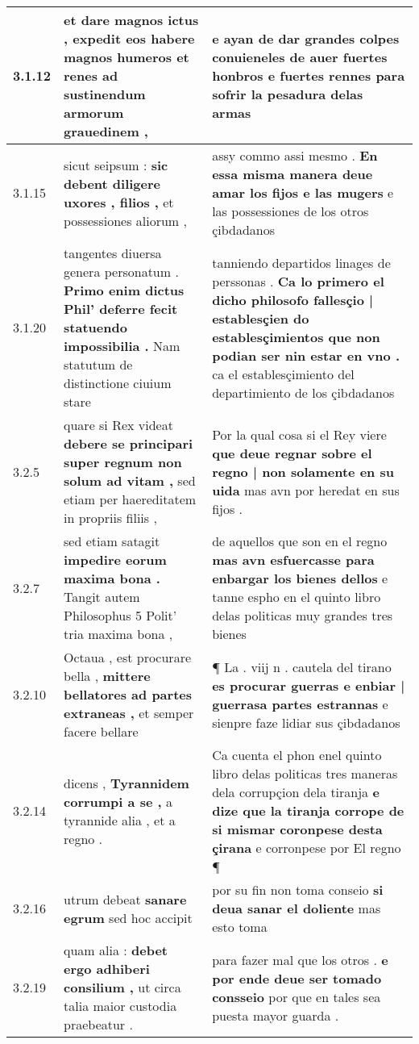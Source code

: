 \begin{tabular}{|p{1cm}|p{6.5cm}|p{6.5cm}|}
3.1.12 & et dare magnos ictus , \textbf{ expedit eos habere magnos humeros et renes } ad sustinendum armorum grauedinem , & e ayan de dar grandes colpes \textbf{ conuieneles de auer fuertes honbros e fuertes rennes } para sofrir la pesadura delas armas \\\hline
3.1.15 & sicut seipsum : \textbf{ sic debent diligere uxores , filios , } et possessiones aliorum , & assy commo assi mesmo . \textbf{ En essa misma manera deue amar los fijos e las mugers } e las possessiones de los otros çibdadanos \\\hline
3.1.20 & tangentes diuersa genera personatum . \textbf{ Primo enim dictus Phil’ deferre fecit statuendo impossibilia . } Nam statutum de distinctione ciuium stare & tanniendo departidos linages de perssonas . \textbf{ Ca lo primero el dicho philosofo fallesçio | establesçien do establesçimientos que non podian ser nin estar en vno . } ca el establesçimiento del departimiento de los çibdadanos \\\hline
3.2.5 & quare si Rex videat \textbf{ debere se principari super regnum non solum ad vitam , } sed etiam per haereditatem in propriis filiis , & Por la qual cosa si el Rey viere \textbf{ que deue regnar sobre el regno | non solamente en su uida } mas avn por heredat en sus fijos . \\\hline
3.2.7 & sed etiam satagit \textbf{ impedire eorum maxima bona . } Tangit autem Philosophus 5 Polit’ tria maxima bona , & de aquellos que son en el regno \textbf{ mas avn esfuercasse para enbargar los bienes dellos } e tanne espho en el quinto libro delas politicas muy grandes tres bienes \\\hline
3.2.10 & Octaua , est procurare bella , \textbf{ mittere bellatores ad partes extraneas , } et semper facere bellare & ¶ La . viij n . cautela del tirano \textbf{ es procurar guerras e enbiar | guerrasa partes estrannas } e sienpre faze lidiar sus çibdadanos \\\hline
3.2.14 & dicens , \textbf{ Tyrannidem corrumpi a se , } a tyrannide alia , et a regno . & Ca cuenta el phon enel quinto libro delas politicas tres maneras dela corrupçion dela tiranja \textbf{ e dize que la tiranja corrope de si mismar coronpese desta çirana } e corronpese por El regno ¶ \\\hline
3.2.16 & utrum debeat \textbf{ sanare egrum } sed hoc accipit & por su fin non toma conseio \textbf{ si deua sanar el doliente } mas esto toma \\\hline
3.2.19 & quam alia : \textbf{ debet ergo adhiberi consilium , } ut circa talia maior custodia praebeatur . & para fazer mal que los otros . \textbf{ e por ende deue ser tomado consseio } por que en tales sea puesta mayor guarda . \\\hline

\end{tabular}
